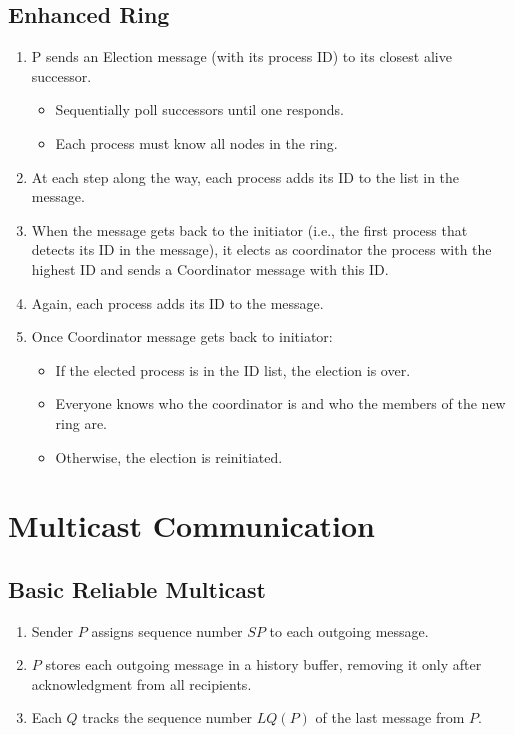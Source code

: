 \subsection{Enhanced Ring}
\begin{enumerate}
    \item P sends an Election message (with its process ID) to its closest alive successor.
    \begin{itemize}
        \item Sequentially poll successors until one responds.
        \item Each process must know all nodes in the ring.
    \end{itemize}
    
    \item At each step along the way, each process adds its ID to the list in the message.
    
    \item When the message gets back to the initiator (i.e., the first process that detects its ID in the message), it elects as coordinator the process with the highest ID and sends a Coordinator message with this ID.
    
    \item Again, each process adds its ID to the message.
    
    \item Once Coordinator message gets back to initiator:
    \begin{itemize}
        \item If the elected process is in the ID list, the election is over.
        \item Everyone knows who the coordinator is and who the members of the new ring are.
        \item Otherwise, the election is reinitiated.
    \end{itemize}
\end{enumerate}


\section{Multicast Communication}
\subsection{Basic Reliable Multicast}
\begin{enumerate}
    \item Sender \( P \) assigns sequence number \( SP \) to each outgoing message.
    \item \( P \) stores each outgoing message in a history buffer, removing it only after acknowledgment from all recipients.
    \item Each \( Q \) tracks the sequence number \( LQ(P) \) of the last message from \( P \).
\end{enumerate}

